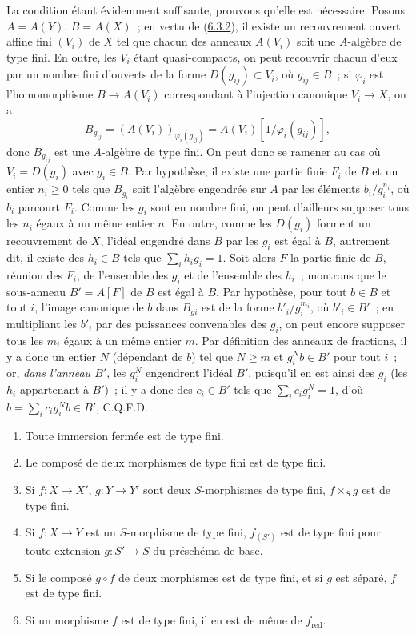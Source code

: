 La condition étant évidemment suffisante, prouvons qu'elle est nécessaire.
Posons $A=A(Y)$, $B=A(X)$~; en vertu de
(\hyperref[I.6.3.2-fr]{6.3.2}), il existe un recouvrement ouvert affine fini
$(V_i)$ de $X$ tel que chacun des anneaux $A(V_i)$ soit une $A$-algèbre de
type fini. En outre, les $V_i$ étant quasi-compacts, on peut recouvrir chacun
d'eux par un nombre fini d'ouverts de la forme $D(g_{ij})\subset V_i$, où
$g_{ij}\in B$~; si $\varphi_i$ est l'homomorphisme $B\to A(V_i)$ correspondant
à l'injection canonique $V_i\to X$, on a
\[
  B_{g_{ij}}=(A(V_i))_{\varphi_i(g_{ij})}
  =A(V_i)[1/\varphi_i(g_{ij})],
\]
donc $B_{g_{ij}}$ est une $A$-algèbre de type fini. On peut donc se ramener
au cas où $V_i=D(g_i)$ avec $g_i\in B$. Par hypothèse, il existe une partie
finie $F_i$ de $B$ et un entier $n_i\geq 0$ tels que $B_{g_i}$ soit l'algèbre
engendrée sur $A$ par les éléments $b_i/g_i^{n_i}$, où $b_i$ parcourt $F_i$.
Comme les $g_i$ sont en nombre fini, on peut d'ailleurs supposer tous les
$n_i$ égaux à un même entier $n$. En outre, comme les $D(g_i)$ forment un
recouvrement de $X$, l'idéal engendré dans $B$ par les $g_i$ est égal à $B$,
autrement dit, il existe des $h_i\in B$ tels que
$\sum_i h_i g_i=1$. Soit alors $F$ la partie finie de $B$, réunion des $F_i$,
de l'ensemble des $g_i$ et de l'ensemble des $h_i$~; montrons que le
sous-anneau $B'=A[F]$ de $B$ est égal à $B$. Par hypothèse, pour tout $b\in B$
et tout $i$, l'image canonique de $b$ dans $B_{gi}$ est de la forme
$b'_i/g_i^{m_i}$, où $b'_i\in B'$~; en multipliant les $b'_i$ par des
puissances convenables des $g_i$, on peut encore supposer tous les $m_i$
égaux à un même entier $m$. Par définition des anneaux de fractions, il y a
donc un entier $N$ (dépendant de $b$) tel que $N\geq m$ et $g_i^N b\in B'$ pour
tout $i$~; or, \emph{dans l'anneau $B'$}, les $g_i^N$ engendrent l'idéal $B'$,
puisqu'il en est ainsi des $g_i$ (les $h_i$ appartenant à $B'$)~; il y a donc
des $c_i\in B'$ tels que $\sum_i c_i g_i^N=1$, d'où
$b=\sum_i c_i g_i^N b\in B'$, C.Q.F.D.

\begin{proposition}[6.3.4]
\label{I.6.3.4-fr}
\begin{enumerate}
  \item[(i)] Toute immersion fermée est de type fini.
  \item[(ii)] Le composé de deux morphismes de type fini est de type fini.
  \item[(iii)] Si $f:X\to X'$, $g:Y\to Y'$ sont deux $S$-morphismes de type
    fini, $f\times_S g$ est de type fini.
  \item[(iv)] Si $f:X\to Y$ est un $S$-morphisme de type fini, $f_{(S')}$ est
    de type fini pour toute extension $g:S'\to S$ du préschéma de base.
  \item[(v)] Si le composé $g\circ f$ de deux morphismes est de type fini, et
    si $g$ est séparé, $f$ est de type fini.
  \item[(vi)] Si un morphisme $f$ est de type fini, il en est de même de
    $f_{\mathrm{red}}$.
\end{enumerate}
\end{proposition}

